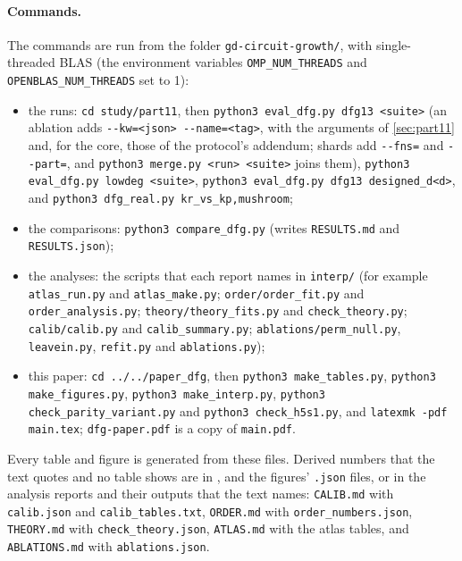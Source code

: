 \paragraph{Commands.} {\raggedright The commands are run from the folder \texttt{gd-circuit-growth/}, with single-threaded BLAS (the environment variables \texttt{OMP\_NUM\_THREADS} and \texttt{OPENBLAS\_NUM\_THREADS} set to 1):\par}
\begin{itemize}\raggedright
\item the runs: \texttt{cd study/part11}, then \texttt{python3 eval\_dfg.py dfg13 <suite>} (an ablation adds \texttt{-{}-kw=<json> -{}-name=<tag>}, with the arguments of \cref{sec:part11} and, for the core, those of the protocol's addendum; shards add \texttt{-{}-fns=} and \texttt{-{}-part=}, and \texttt{python3 merge.py <run> <suite>} joins them), \texttt{python3 eval\_dfg.py lowdeg <suite>}, \texttt{python3 eval\_dfg.py dfg13 designed\_d<d>}, and \texttt{python3 dfg\_real.py kr\_vs\_kp,mushroom};
\item the comparisons: \texttt{python3 compare\_dfg.py} (writes \texttt{RESULTS.md} and \texttt{RESULTS.json});
\item the analyses: the scripts that each report names in \texttt{interp/} (for example \texttt{atlas\_run.py} and \texttt{atlas\_make.py}; \texttt{order/order\_fit.py} and \texttt{order\_analysis.py}; \texttt{theory/theory\_fits.py} and \texttt{check\_theory.py}; \texttt{calib/calib.py} and \texttt{calib\_summary.py}; \texttt{ablations/perm\_null.py}, \texttt{leavein.py}, \texttt{refit.py} and \texttt{ablations.py});
\item this paper: \texttt{cd ../../paper\_dfg}, then \texttt{python3 make\_tables.py}, \texttt{python3 make\_figures.py}, \texttt{python3 make\_interp.py}, \texttt{python3 check\_parity\_variant.py} and \texttt{python3 check\_h5s1.py}, and \texttt{latexmk -pdf main.tex}; \texttt{dfg-paper.pdf} is a copy of \texttt{main.pdf}.
\end{itemize}
Every table and figure is generated from these files. Derived numbers that the text quotes and no table shows are in ,  and the figures' \texttt{.json} files, or in the analysis reports and their outputs that the text names: \texttt{CALIB.md} with \texttt{calib.json} and \texttt{calib\_tables.txt}, \texttt{ORDER.md} with \texttt{order\_numbers.json}, \texttt{THEORY.md} with \texttt{check\_theory.json}, \texttt{ATLAS.md} with the atlas tables, and \texttt{ABLATIONS.md} with \texttt{ablations.json}.

